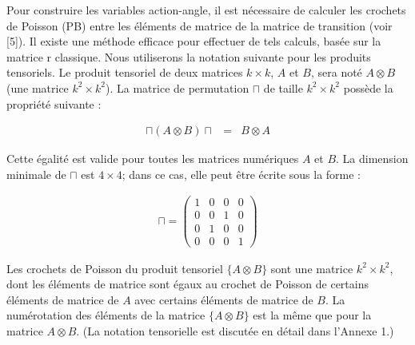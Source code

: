 Pour construire les variables action-angle, il est nécessaire de calculer les crochets de Poisson (PB) entre les éléments de matrice de la matrice de transition (voir [5]). Il existe une méthode efficace pour effectuer de tels calculs, basée sur la matrice r classique. Nous utiliserons la notation suivante pour les produits tensoriels. Le produit tensoriel de deux matrices \( k \times k \), \( A \) et \( B \), sera noté \( A \otimes B \) (une matrice \( k^2 \times k^2 \)). La matrice de permutation \( \sqcap \) de taille \( k^2 \times k^2 \) possède la propriété suivante :


\begin{eqnarray}
	\sqcap ( A \otimes B ) \sqcap & = & B \otimes A 
\end{eqnarray}

Cette égalité est valide pour toutes les matrices numériques \( A \) et \( B \). La dimension minimale de \( \sqcap \) est \( 4 \times 4 \); dans ce cas, elle peut être écrite sous la forme :

\begin{eqnarray}
	\sqcap =\begin{pmatrix}1 & 0 & 0 & 0 \\0 & 0 & 1 & 0 \\0 & 1 & 0 & 0 \\0 & 0 & 0 & 1\end{pmatrix}	
\end{eqnarray}

\begin{Defi}
	Les crochets de Poisson du produit tensoriel \(\{A \otimes B\}\) sont une matrice \( k^2 \times k^2 \), dont les éléments de matrice sont égaux au crochet de Poisson de certains éléments de matrice de \( A \) avec certains éléments de matrice de \( B \). La numérotation des éléments de la matrice \(\{A \otimes B\}\) est la même que pour la matrice \( A \otimes B \). (La notation tensorielle est discutée en détail dans l'Annexe 1.)
\end{Defi}

